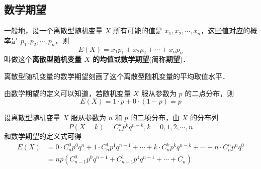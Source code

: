 
\begin{issues}
\issueDraft
\end{issues}

\subsection{数学期望}
一般地，设一个离散型随机变量 $X$ 所有可能的值是 $x_1,x_2,\cdots,x_n$，这些值对应的概率是 $p_1,p_2,\cdots,p_n$，则
\begin{equation}
E(X) = x_1p_1 + x_2p_2 + \cdots + x_np_n
\end{equation}
叫做这个\textbf{离散型随机变量 $X$ 的均值}或\textbf{数学期望}(简称\textbf{期望})．

离散型随机变量的数学期望刻画了这个离散型随机变量的平均取值水平．

由数学期望的定义可以知道，若随机变量 $X$ 服从参数为 $p$ 的二点分布，则
\begin{equation}
E(X) = 1 \cdot p + 0 \cdot(1 - p) = p
\end{equation}

设离散型随机变量 $X$ 服从参数为 $n$ 和 $p$ 的二项分布，由 $X$ 的分布列
\begin{equation}
P(X = k) = C_n^kp^kq^{n-k},k=0,1,2,\cdots ,n
\end{equation}
和数学期望的定义式可得
\begin{equation}
\begin{aligned}
E(X) &= 0\cdot C_n^0p^0q^n+1\cdot C_n^1p^1q^{n-1}+\cdots +k\cdot C_n^kp^kq^{n-k}+\cdots +n\cdot C_n^np^nq^0 \\
&=np(C_{n-1}^0p^0q^{n-1}+C_{n-1}^1p^1q^{n-1}+\cdots +C_{n})
\end{aligned}
\end{equation}